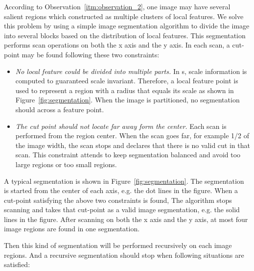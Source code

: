 According to Observation~\ref{itm:observation_2}, one image may have several salient regions which constructed as multiple clusters of local features. We solve this problem by using a simple image segmentation algorithm to divide the image into several blocks based on the distribution of local features. This segmentation performs scan operations on both the x axis and the y axis. In each scan, a cut-point may be found following these two constraints:

\begin{itemize}

  \item \textit{No local feature could be divided into multiple parts.} In {\lfea}s, scale information is computed to guaranteed scale invariant. Therefore, a local feature point is used to represent a region with a radius that equals its scale as shown in Figure~\ref{fig:segmentation}. When the image is partitioned, no segmentation should across a feature point.

  \item \textit{The cut point should not locate far away form the center.} Each scan is performed from the region center. When the scan goes far, for example 1/2 of the image width, the scan stops and declares that there is no valid cut in that scan. This constraint attends to keep segmentation balanced and avoid too large regions or too small regions.

\end{itemize}

A typical segmentation is shown in Figure~\ref{fig:segmentation}. The segmentation is started from the center of each axis, e.g. the dot lines in the figure. When a cut-point satisfying the above two constraints is found, The algorithm stops scanning and takes that cut-point as a valid image segmentation, e.g. the solid lines in the figure. After scanning on both the x axis and the y axis, at most four image regions are found in one segmentation.

Then this kind of segmentation will be performed recursively on each image regions. And a recursive segmentation should stop when following situations are satisfied:

